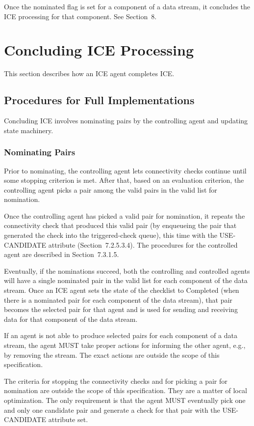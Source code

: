 \documentclass{article}
\begin{document}
Once the nominated flag is set for a component of a data stream, it concludes the ICE processing for that component.  See Section~8.

\section{Concluding ICE Processing}

This section describes how an ICE agent completes ICE.

\subsection{Procedures for Full Implementations}

Concluding ICE involves nominating pairs by the controlling agent and updating state machinery.

\subsubsection{Nominating Pairs}

Prior to nominating, the controlling agent lets connectivity checks continue until some stopping criterion is met.  After that, based on an evaluation criterion, the controlling agent picks a pair among the valid pairs in the valid list for nomination.

Once the controlling agent has picked a valid pair for nomination, it repeats the connectivity check that produced this valid pair (by enqueueing the pair that generated the check into the triggered-check queue), this time with the USE-CANDIDATE attribute (Section~7.2.5.3.4).  The procedures for the controlled agent are described in Section~7.3.1.5.

Eventually, if the nominations succeed, both the controlling and controlled agents will have a single nominated pair in the valid list for each component of the data stream.  Once an ICE agent sets the state of the checklist to Completed (when there is a nominated pair for each component of the data stream), that pair becomes the selected pair for that agent and is used for sending and receiving data for that component of the data stream.

If an agent is not able to produce selected pairs for each component of a data stream, the agent MUST take proper actions for informing the other agent, e.g., by removing the stream.  The exact actions are outside the scope of this specification.

The criteria for stopping the connectivity checks and for picking a pair for nomination are outside the scope of this specification. They are a matter of local optimization.  The only requirement is that the agent MUST eventually pick one and only one candidate pair and generate a check for that pair with the USE-CANDIDATE attribute set.
\end{document}
